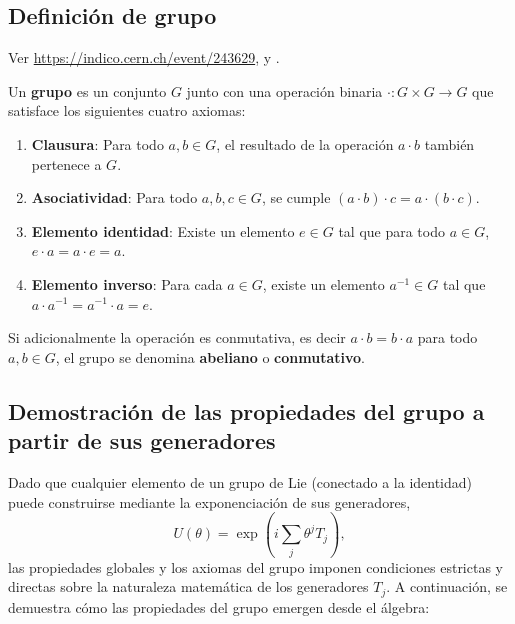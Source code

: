 \subsection{Definición de grupo}
Ver \url{https://indico.cern.ch/event/243629}, \cite{salcedofisica} y \cite{Zee:2016fuk}.

Un \textbf{grupo} es un conjunto $G$ junto con una operación binaria $\cdot: G \times G \to G$ que satisface los siguientes cuatro axiomas:
\begin{enumerate}
  \item \textbf{Clausura}: Para todo $a, b \in G$, el resultado de la operación $a \cdot b$ también pertenece a $G$.
  \item \textbf{Asociatividad}: Para todo $a, b, c \in G$, se cumple $(a \cdot b) \cdot c = a \cdot (b \cdot c)$.
  \item \textbf{Elemento identidad}: Existe un elemento $e \in G$ tal que para todo $a \in G$, $e \cdot a = a \cdot e = a$.
  \item \textbf{Elemento inverso}: Para cada $a \in G$, existe un elemento $a^{-1} \in G$ tal que $a \cdot a^{-1} = a^{-1} \cdot a = e$.
\end{enumerate}
Si adicionalmente la operación es conmutativa, es decir $a \cdot b = b \cdot a$ para todo $a, b \in G$, el grupo se denomina \textbf{abeliano} o \textbf{conmutativo}.

\subsection{Demostración de las propiedades del grupo a partir de sus generadores}

Dado que cualquier elemento de un grupo de Lie (conectado a la identidad) puede construirse mediante la exponenciación de sus generadores, 
\begin{equation}
    U(\theta) = \exp\left(i \sum_j \theta^j T_j\right),
\end{equation}
las propiedades globales y los axiomas del grupo imponen condiciones estrictas y directas sobre la naturaleza matemática de los generadores $T_j$. A continuación, se demuestra cómo las propiedades del grupo emergen desde el álgebra:

